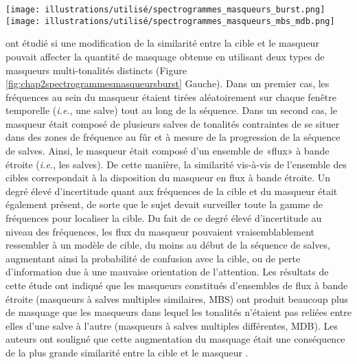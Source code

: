 \begin{figure*}[!t]
\center
\texttt{[image: illustrations/utilisé/spectrogrammes\_masqueurs\_burst.png]}
\texttt{[image: illustrations/utilisé/spectrogrammes\_masqueurs\_mbs\_mdb.png]}
\caption[Masqueurs à «salves» multiples similaires (MBS) et différentes (MDB)]{Masqueurs à «salves» multiples similaires (MBS) et différentes (MDB). 
(Gauche) Spectrogrammes sonores du masqueur et de la cible pour MBD (lignes en gras : $1$~kHz), le nombre de salves du masqueur variant de $1$ (salve unique) à $8$ (rangée supérieure) et l'intervalle entre les salves variant pour quatre salves du masqueur (rangée inférieure). Adapté de \cite{kidd2003multiple}.
(Droite) Spectrogrammes sonores de masqueurs avec cibles (lignes en gras : $1$~kHz) à rafales multiples similaires (MBS, rangée du haut) et à rafales multiples différentes (MBD, rangée du bas). Dans la colonne de gauche (S pour Similar), la fréquence cible varie/reste constante dans le temps de manière similaire aux fréquences du masqueur dans le temps, alors que dans la colonne de droite (D pour Dissimilar), la fréquence cible dans le temps diffère des fréquences du masqueur dans le temps. Adapté de \cite{durlach2003informational}.}
\label{fig:chap2spectrogrammesmasqueursburst}
\end{figure*}

\cite{kidd2003multiple} ont étudié si une modification de la similarité entre la cible et le masqueur pouvait affecter la quantité de masquage obtenue en utilisant deux types de masqueurs multi-tonalités distincts (Figure \ref{fig:chap2spectrogrammesmasqueursburst} Gauche). 
Dans un premier cas, les fréquences au sein du masqueur étaient tirées aléatoirement sur chaque fenêtre temporelle (\textit{i.e.}, une salve) tout au long de la séquence.
Dans un second cas, le masqueur était composé de plusieurs salves de tonalités contraintes de se situer dans des zones de fréquence au fûr et à mesure de la progression de la séquence de salves. 
Ainsi, le masqueur était composé d'un ensemble de «flux» à bande étroite (\textit{i.e.}, les salves). 
De cette manière, la similarité vis-à-vis de l'ensemble des cibles correspondait à la disposition du masqueur en flux à bande étroite. 
Un degré élevé d'incertitude quant aux fréquences de la cible et du masqueur était également présent, de sorte que le sujet devait surveiller toute la gamme de fréquences pour localiser la cible. 
Du fait de ce degré élevé d'incertitude au niveau des fréquences, les flux du masqueur pouvaient vraisemblablement ressembler à un modèle de cible, du moins au début de la séquence de salves, augmentant ainsi la probabilité de confusion avec la cible, ou de perte d'information due à une mauvaise orientation de l'attention. 
Les résultats de cette étude ont indiqué que les masqueurs constitués d'ensembles de flux à bande étroite (masqueurs à salves multiples similaires, MBS) ont produit beaucoup plus de masquage que les masqueurs dans lequel les tonalités  n'étaient pas reliées entre elles d'une salve à l'autre (masqueurs à salves multiples différentes, MDB). 
Les auteurs ont souligné que cette augmentation du masquage était une conséquence de la plus grande similarité entre la cible et le masqueur \citep{kidd2003multiple}. 

